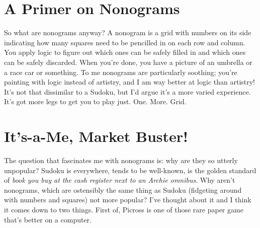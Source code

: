 \documentclass{book}
\begin{document}
\FloatBarrier\needspace{10mm}\section*{A Primer on Nonograms}\nopagebreak[4]

So what are nonograms anyway? A nonogram is a grid with numbers on its side indicating how many squares need to be pencilled in on each row and column. You apply logic to figure out which ones can be safely filled in and which ones can be safely discarded. When you’re done, you have a picture of an umbrella or a race car or something. To me nonograms are particularly soothing; you’re painting with logic instead of artistry, and I am way better at logic than artistry! It’s not that dissimilar to a Sudoku, but I’d argue it’s a more varied experience. It’s got more legs to get you to play just. One. More. Grid.

\FloatBarrier\needspace{10mm}\section*{It’s-a-Me, Market Buster!}\nopagebreak[4]

The question that fascinates me with nonograms is: why are they so utterly unpopular? Sudoku is everywhere, tends to be well-known, is the golden standard of \emph{book you buy at the cash register next to an Archie omnibus}. Why aren’t nonograms, which are ostensibly the same thing as Sudoku (fidgeting around with numbers and squares) not more popular? I’ve thought about it and I think it comes down to two things. First of, Picross is one of those rare paper game that’s better on a computer.
\end{document}
